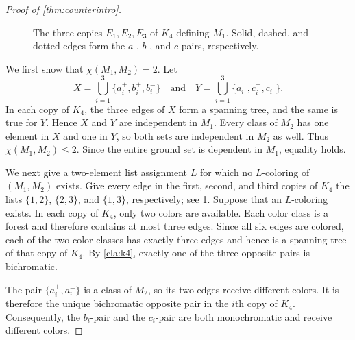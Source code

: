 \documentclass{article}
\theoremstyle{plain}
\theoremstyle{definition}
\begin{document}
\begin{proof}[Proof of \cref{thm:counterintro}]
\begin{figure}[t]
\caption{The three copies $E_1,E_2,E_3$ of $K_4$ defining $M_1$. Solid, dashed, and dotted edges form the $a$-, $b$-, and $c$-pairs, respectively.}
\label{fig:construction}
\end{figure}

We first show that $\chi(M_1,M_2)=2$. Let
\[
X=\bigcup_{i=1}^3\{a_i^+,b_i^+,b_i^-\}\quad\text{and}\quad Y=\bigcup_{i=1}^3\{a_i^-,c_i^+,c_i^-\}.
\]
In each copy of $K_4$, the three edges of $X$ form a spanning tree, and the same is true for $Y$. Hence $X$ and $Y$ are independent in $M_1$. Every class of $M_2$ has one element in $X$ and one in $Y$, so both sets are independent in $M_2$ as well. Thus $\chi(M_1,M_2)\le2$. Since the entire ground set is dependent in $M_1$, equality holds.

We next give a two-element list assignment $L$ for which no $L$-coloring of $(M_1,M_2)$ exists. Give every edge in the first, second, and third copies of $K_4$ the lists $\{1,2\}$, $\{2,3\}$, and $\{1,3\}$, respectively; see \cref{fig:construction}. Suppose that an $L$-coloring exists. In each copy of $K_4$, only two colors are available. Each color class is a forest and therefore contains at most three edges. Since all six edges are colored, each of the two color classes has exactly three edges and hence is a spanning tree of that copy of $K_4$. By \cref{cla:k4}, exactly one of the three opposite pairs is bichromatic.

The pair $\{a_i^+,a_i^-\}$ is a class of $M_2$, so its two edges receive different colors. It is therefore the unique bichromatic opposite pair in the $i$th copy of $K_4$. Consequently, the $b_i$-pair and the $c_i$-pair are both monochromatic and receive different colors.


\end{proof}
\end{document}
